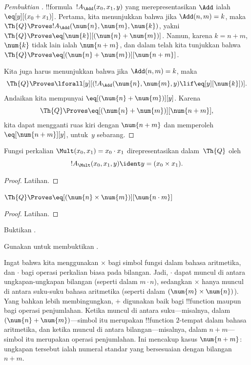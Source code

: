 \documentclass[../../../include/open-logic-section]{subfiles}
\begin{document}
\begin{proof}[Pembuktian ]
!!{formula}~$!A_\Add(x_0, x_1, y)$ yang merepresentasikan $\Add$ ialah
$\eq[y][(x_0 + x_1)]$. Pertama, kita menunjukkan bahwa jika
$\Add(n, m) = k$, maka
$\Th{Q} \Proves !A_\Add(\num{n}, \num{m}, \num{k})$, yakni
$\Th{Q} \Proves \eq[\num{k}][(\num{n} + \num{m})]$. Namun, karena
$k = n + m$, $\num{k}$ tidak lain ialah $\num{n+m}$, dan dalam
 telah kita tunjukkan bahwa
$\Th{Q} \Proves \eq[(\num{n} + \num{m})][\num{n+m}]$.

Kita juga harus menunjukkan bahwa jika $\Add(n, m) = k$, maka
\[
\Th{Q} \Proves \lforall[y][(!A_\Add(\num{n}, \num{m}, y) \lif
  \eq[y][\num{k}])].
\]
Andaikan kita mempunyai $\eq[(\num{n} + \num{m})][y]$. Karena
\[
\Th{Q} \Proves \eq[(\num{n}+\num{m})][\num{n+m}],
\]
kita dapat mengganti ruas kiri dengan $\num{n+m}$ dan memperoleh
$\eq[\num{n+m}][y]$, untuk~$y$ sebarang.
\end{proof}

\begin{prop}
Fungsi perkalian $\Mult(x_0, x_1) = x_0 \cdot x_1$ direpresentasikan
dalam~$\Th{Q}$ oleh
\[
  !A_{\Mult}(x_0, x_1, y) \ident y = (x_0 \times x_1).
\]
\end{prop}

\begin{proof} Latihan. \end{proof}

\begin{lem}
$\Th{Q} \Proves \eq[(\num{n} \times \num{m})][\num{n \cdot m}]$
\end{lem}

\begin{proof} Latihan. \end{proof}

\begin{prob}
Buktikan .
\end{prob}

\begin{prob}
Gunakan  untuk membuktikan
.
\end{prob}

\begin{explain}
  Ingat bahwa kita menggunakan $\times$ bagi simbol fungsi dalam bahasa
  aritmetika, dan $\cdot$ bagi operasi perkalian biasa pada bilangan. Jadi,
  $\cdot$ dapat muncul di antara ungkapan-ungkapan bilangan (seperti dalam
  $m \cdot n$), sedangkan $\times$ hanya muncul di antara suku-suku bahasa
  aritmetika (seperti dalam $(\num{m} \times \num{n})$). Yang bahkan lebih
  membingungkan, $+$ digunakan baik bagi !!{function} maupun bagi operasi
  penjumlahan. Ketika muncul di antara suku---misalnya, dalam
  $(\num{n} + \num{m})$---simbol itu merupakan !!{function} $2$-tempat dalam
  bahasa aritmetika, dan ketika muncul di antara bilangan---misalnya, dalam
  $n+m$---simbol itu merupakan operasi penjumlahan. Ini mencakup kasus
  $\num{n+m}$: ungkapan tersebut ialah numeral standar yang bersesuaian
  dengan bilangan~$n+m$.
\end{explain}
\end{document}
